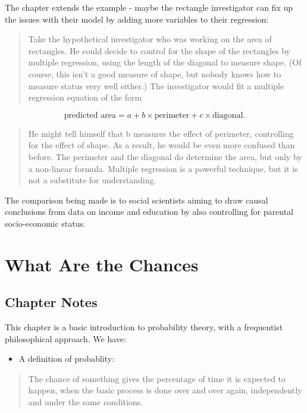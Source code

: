 \documentclass[
]{book}
\providecommand{\tightlist}{%
  \setlength{\itemsep}{0pt}\setlength{\parskip}{0pt}}
\begin{document}
The chapter extends the example - maybe the rectangle investigator can fix up the issues with their model by adding more variables to their regression:

\begin{quote}
Take the hypothetical investigator who was working on the area of rectangles. He could decide to control for the shape of the rectangles by multiple regression, using the length of the diagonal to measure shape. (Of course, this isn't a good measure of shape, but nobody knows how to measure status very well either.) The investigator would fit a multiple regression equation of the form
\end{quote}

\[
\text{predicted area} = a + b \times \text{perimeter} + c \times \text{diagonal}.
\]

\begin{quote}
He might tell himself that b measures the effect of perimeter, controlling for the effect of shape. As a result, he would be even more confused than before. The perimeter and the diagonal do determine the area, but only by a non-linear formula. Multiple regression is a powerful technique, but it is not a substitute for understanding.
\end{quote}

The comparison being made is to social scientists aiming to draw causal conclusions from data on income and education by also controlling for parental socio-economic status.

\hypertarget{chances}{%
\chapter{What Are the Chances}\label{chances}}

\hypertarget{chapter-notes-12}{%
\section{Chapter Notes}\label{chapter-notes-12}}

This chapter is a basic introduction to probability theory, with a frequentist philosophical approach. We have:

\begin{itemize}
\tightlist
\item
  A definition of probablity:
\end{itemize}

\begin{quote}
The chance of something gives the percentage of time it is expected to happen, when the basic process is done over and over again, independently and under the same conditions.
\end{quote}
\end{document}
